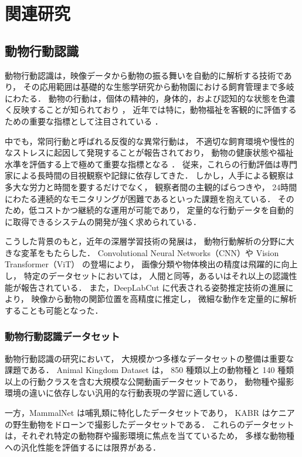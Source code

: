 \chapter{関連研究}

\section{動物行動認識}

動物行動認識は，映像データから動物の振る舞いを自動的に解析する技術であり，
その応用範囲は基礎的な生態学研究から動物園における飼育管理まで多岐にわたる．
動物の行動は，個体の精神的，身体的，および認知的な状態を色濃く反映することが知られており \cite{broom1986indicators}，
近年では特に，動物福祉を客観的に評価するための重要な指標として注目されている \cite{mellor2017updating}．

中でも，常同行動と呼ばれる反復的な異常行動は，
不適切な飼育環境や慢性的なストレスに起因して発現することが報告されており，
動物の健康状態や福祉水準を評価する上で極めて重要な指標となる \cite{mason1991stereotypies}．
従来，これらの行動評価は専門家による長時間の目視観察や記録に依存してきた．
しかし，人手による観察は多大な労力と時間を要するだけでなく，
観察者間の主観的ばらつきや，
24時間にわたる連続的なモニタリングが困難であるといった課題を抱えている．
そのため，低コストかつ継続的な運用が可能であり，
定量的な行動データを自動的に取得できるシステムの開発が強く求められている．

こうした背景のもと，近年の深層学習技術の発展は，
動物行動解析の分野に大きな変革をもたらした．
Convolutional Neural Networks（CNN）や
Vision Transformer（ViT）\cite{dosovitskiy2020vit} の登場により，
画像分類や物体検出の精度は飛躍的に向上し，
特定のデータセットにおいては，
人間と同等，あるいはそれ以上の認識性能が報告されている．
また，DeepLabCut \cite{mathis2018deeplabcut} に代表される姿勢推定技術の進展により，
映像から動物の関節位置を高精度に推定し，
微細な動作を定量的に解析することも可能となった．

\subsection{動物行動認識データセット}

動物行動認識の研究において，
大規模かつ多様なデータセットの整備は重要な課題である．
Animal Kingdom Dataset \cite{ng2022animal} は，
850 種類以上の動物種と 140 種類以上の行動クラスを含む大規模な公開動画データセットであり，
動物種や撮影環境の違いに依存しない汎用的な行動表現の学習に適している．

一方，MammalNet \cite{chen2021mammalnet} は哺乳類に特化したデータセットであり，
KABR \cite{kabr2022} はケニアの野生動物をドローンで撮影したデータセットである．
これらのデータセットは，それぞれ特定の動物群や撮影環境に焦点を当てているため，
多様な動物種への汎化性能を評価するには限界がある．

